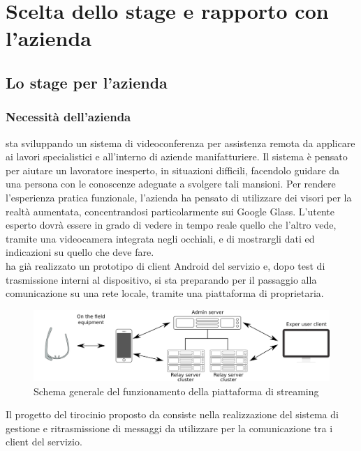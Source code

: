 \chapter{Scelta dello stage e rapporto con l'azienda}

\section{Lo stage per l'azienda}

   \subsection{Necessità dell'azienda}
   \nomeAzienda{} sta sviluppando un sistema di videoconferenza per assistenza remota da applicare ai lavori specialistici e all'interno di aziende manifatturiere. Il sistema è pensato per aiutare un lavoratore inesperto, in situazioni difficili, facendolo guidare da una persona con le conoscenze adeguate a svolgere tali mansioni. Per rendere l'esperienza pratica funzionale, l'azienda ha pensato di utilizzare dei visori per la realtà aumentata, concentrandosi particolarmente sui Google Glass. L'utente esperto dovrà essere in grado di vedere in tempo reale quello che l'altro vede, tramite una videocamera integrata negli occhiali, e di mostrargli dati ed indicazioni su quello che deve fare.
   \\
   \nomeAzienda{} ha già realizzato un prototipo di client Android del servizio e, dopo test di trasmissione interni al dispositivo, si sta preparando per il passaggio alla comunicazione su una rete locale, tramite una piattaforma di   proprietaria.
   \begin{figure}[H]
      \begin{center}
         \includegraphics[width=16cm,keepaspectratio]{immagini/erastreaming-schema}
         \caption{Schema generale del funzionamento della piattaforma di streaming}
      \end{center}
   \end{figure}
   Il progetto del tirocinio proposto da \nomeAzienda{} consiste nella realizzazione del sistema di gestione e ritrasmissione di messaggi da utilizzare per la comunicazione tra i client del servizio.

